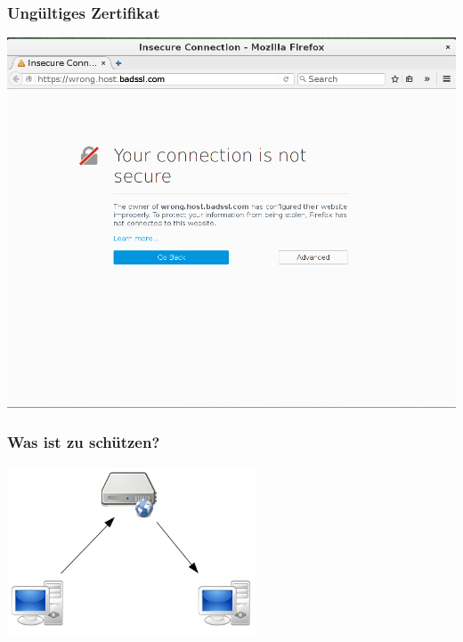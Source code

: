\documentclass[12pt, xcolor={svgnames,table}]{beamer}
\begin{document}
\begin{frame}
    \frametitle{Ungültiges Zertifikat}
    \begin{center}
	\includegraphics[height=0.7\textheight]{img/ssl_badcert.png}
    \end{center}
\end{frame}

\begin{frame}
    \frametitle{Was ist zu schützen?}
    \begin{center}
      \includegraphics[height=5cm]{img/c-s.png}
    \end{center}
\end{frame}
\end{document}
